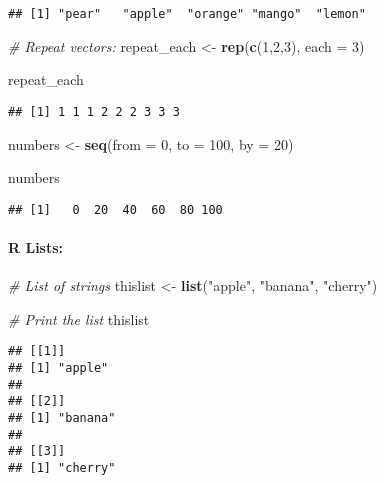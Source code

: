 \documentclass[
]{article}
\newenvironment{Shaded}{\begin{snugshade}}{\end{snugshade}}
\newcommand{\AttributeTok}[1]{\textcolor[rgb]{0.13,0.29,0.53}{#1}}
\newcommand{\CommentTok}[1]{\textcolor[rgb]{0.56,0.35,0.01}{\textit{#1}}}
\newcommand{\DecValTok}[1]{\textcolor[rgb]{0.00,0.00,0.81}{#1}}
\newcommand{\FunctionTok}[1]{\textcolor[rgb]{0.13,0.29,0.53}{\textbf{#1}}}
\newcommand{\NormalTok}[1]{#1}
\newcommand{\OtherTok}[1]{\textcolor[rgb]{0.56,0.35,0.01}{#1}}
\newcommand{\StringTok}[1]{\textcolor[rgb]{0.31,0.60,0.02}{#1}}
\begin{document}
\begin{verbatim}
## [1] "pear"   "apple"  "orange" "mango"  "lemon"
\end{verbatim}

\begin{Shaded}
\begin{Highlighting}[]
\CommentTok{\# Repeat vectors:}
\NormalTok{repeat\_each }\OtherTok{\textless{}{-}} \FunctionTok{rep}\NormalTok{(}\FunctionTok{c}\NormalTok{(}\DecValTok{1}\NormalTok{,}\DecValTok{2}\NormalTok{,}\DecValTok{3}\NormalTok{), }\AttributeTok{each =} \DecValTok{3}\NormalTok{)}

\NormalTok{repeat\_each}
\end{Highlighting}
\end{Shaded}

\begin{verbatim}
## [1] 1 1 1 2 2 2 3 3 3
\end{verbatim}

\begin{Shaded}
\begin{Highlighting}[]
\NormalTok{numbers }\OtherTok{\textless{}{-}} \FunctionTok{seq}\NormalTok{(}\AttributeTok{from =} \DecValTok{0}\NormalTok{, }\AttributeTok{to =} \DecValTok{100}\NormalTok{, }\AttributeTok{by =} \DecValTok{20}\NormalTok{)}

\NormalTok{numbers}
\end{Highlighting}
\end{Shaded}

\begin{verbatim}
## [1]   0  20  40  60  80 100
\end{verbatim}

\hypertarget{r-lists}{%
\paragraph{R Lists:}\label{r-lists}}

\begin{Shaded}
\begin{Highlighting}[]
\CommentTok{\# List of strings}
\NormalTok{thislist }\OtherTok{\textless{}{-}} \FunctionTok{list}\NormalTok{(}\StringTok{"apple"}\NormalTok{, }\StringTok{"banana"}\NormalTok{, }\StringTok{"cherry"}\NormalTok{)}

\CommentTok{\# Print the list}
\NormalTok{thislist}
\end{Highlighting}
\end{Shaded}

\begin{verbatim}
## [[1]]
## [1] "apple"
## 
## [[2]]
## [1] "banana"
## 
## [[3]]
## [1] "cherry"
\end{verbatim}
\end{document}
